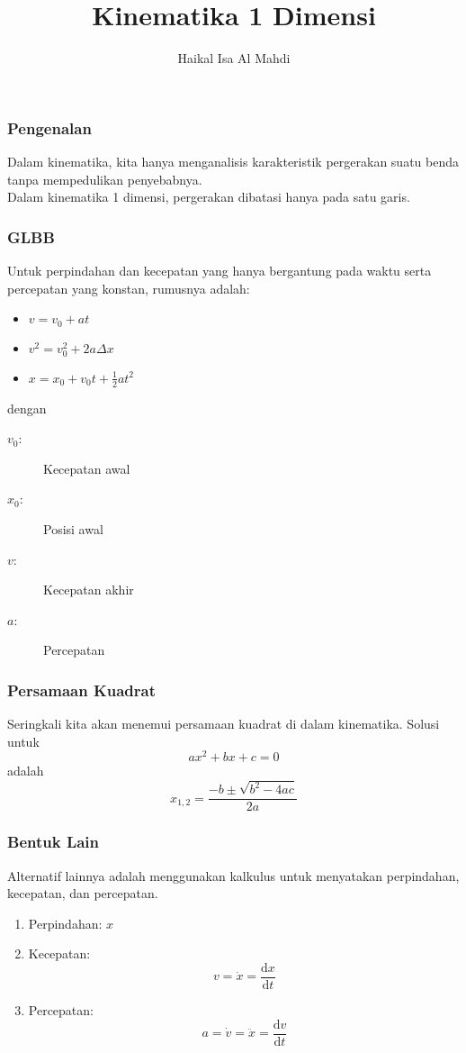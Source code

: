 \documentclass[10pt,aspectratio=54]{beamer}
\newcommand{\deriv}{\mathrm{d}}
\begin{document}
\title{Kinematika 1 Dimensi}
\author{Haikal Isa Al Mahdi}
\date{}

\begin{frame}
\titlepage
\end{frame}

\begin{frame}
\frametitle{Pengenalan}
Dalam kinematika, kita hanya menganalisis karakteristik pergerakan suatu benda tanpa mempedulikan penyebabnya. \\
Dalam kinematika 1 dimensi, pergerakan dibatasi hanya pada satu garis.
\end{frame}

\begin{frame}
\frametitle{GLBB}
Untuk perpindahan dan kecepatan yang hanya bergantung pada waktu serta percepatan yang konstan, rumusnya adalah:
\begin{itemize}
 \item $v=v_0+at$
 \item $v^2 = v_0^2 + 2a\Delta x$
 \item $x = x_0 + v_0t + \frac{1}{2}at^2$
\end{itemize}
dengan
\begin{description}
 \item[$v_0$:] Kecepatan awal
 \item[$x_0$:] Posisi awal
 \item[$v$:] Kecepatan akhir
 \item[$a$:] Percepatan
\end{description}
\end{frame}

\begin{frame}
\frametitle{Persamaan Kuadrat}
Seringkali kita akan menemui persamaan kuadrat di dalam kinematika. Solusi untuk
$$ax^2+bx+c=0$$
adalah
$$x_{1,2} = \frac{-b\pm\sqrt{b^2-4ac}}{2a}$$
\end{frame}

\begin{frame}
\frametitle{Bentuk Lain}
Alternatif lainnya adalah menggunakan kalkulus untuk menyatakan perpindahan, kecepatan, dan percepatan.
\begin{enumerate}
 \item Perpindahan: $x$
 \item Kecepatan: $$v = \dot{x} = \frac{\deriv x}{\deriv t}$$
 \item Percepatan: $$a = \dot{v} = \ddot{x} = \frac{\deriv v}{\deriv t}$$
\end{enumerate}
\end{frame}
\end{document}
